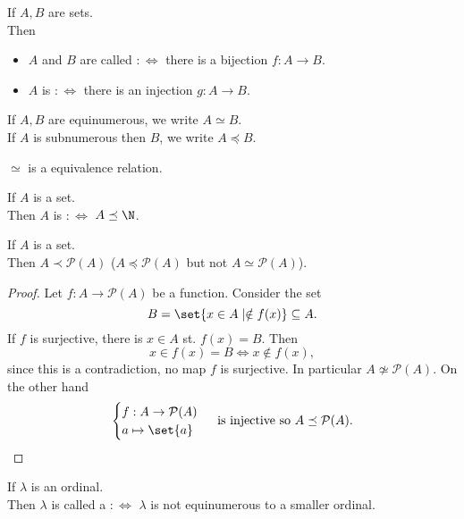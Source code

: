 \begin{definition}
    If $A,B$ are sets.\\
    Then 
    \begin{itemize}
        \item $A$ and $B$ are called  $:\iff$ there is a bijection $f:A \to B$.
        \item $A$ is  $:\iff$ there is an injection $g:A \to B$.
    \end{itemize}
\end{definition}

\begin{notation}
    If $A,B$ are equinumerous, we write $A \simeq B$.\\
    If $A$ is subnumerous then $B$, we write $A \preceq B$.
\end{notation}

\begin{remark}
    $\simeq$ is a equivalence relation.
\end{remark}

\begin{definition}
    If $A$ is a set.\\
    Then $A$ is  $:\iff$ $A \preceq \N$.
\end{definition}

\begin{theorem}[Cantor]
    If $A$ is a set.\\
    Then $A \prec \mathcal{P}(A)$ ($A \preceq \mathcal{P}(A)$ but not $A \simeq \mathcal{P}(A)$).
\end{theorem}
\begin{proof}
    Let $f: A \to \mathcal{P}(A)$ be a function. Consider the set
    $$ B = \set{x \in A \mid \notin f(x)} \subseteq A.$$
    If $f$ is surjective, there is $x \in A$ st. $f(x) = B$.
    Then 
    $$ x \in f(x) = B \iff x \notin f(x), $$
    since this is a contradiction, no map $f$ is surjective. In particular $A \not \simeq \mathcal{P}(A)$.
    On the other hand
    $$\begin{cases}
        f: A \to \mathcal{P}(A)\\
        a \mapsto \set{a}
    \end{cases} \text{ is injective so } A \preceq \mathcal{P}(A).$$
\end{proof}

\begin{definition}
    If $\lambda$ is an ordinal.\\
    Then $\lambda$ is called a  $:\iff$ $\lambda$ is not equinumerous to a smaller ordinal.
\end{definition}

